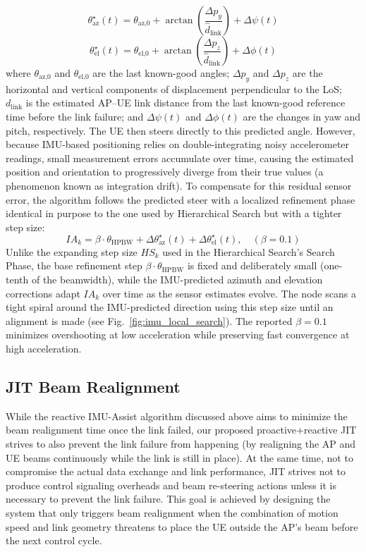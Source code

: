 \documentclass[fleqn,10pt]{wlscirep}
\newcommand{\rev}[1]{#1}
\begin{document}
\begin{equation}
    \theta_{\text{az}}^{\star}(t) = \theta_{\text{az,0}} + \arctan\!\left(\frac{\Delta p_{y}}{\hat{d}_{\text{link}}}\right) + \Delta\psi(t)
\end{equation}
\begin{equation}
    \theta_{\text{el}}^{\star}(t) = \theta_{\text{el,0}} + \arctan\!\left(\frac{\Delta p_{z}}{\hat{d}_{\text{link}}}\right) + \Delta\phi(t)
\end{equation}
where $\theta_{\text{az,0}}$ and $\theta_{\text{el,0}}$ are the last known-good angles; $\Delta p_y$ and $\Delta p_z$ are the horizontal and vertical components of displacement perpendicular to the LoS; $d_{\text{link}}$ is the estimated AP--UE link distance from the last known-good reference time before the link failure; and $\Delta\psi(t)$ and $\Delta\phi(t)$ are the changes in yaw and pitch, respectively. The UE then steers directly to this predicted angle. However, because IMU-based positioning relies on double-integrating noisy accelerometer readings, small measurement errors accumulate over time, causing the estimated position and orientation to progressively diverge from their true values (a phenomenon known as integration drift). To compensate for this residual sensor error, the algorithm follows the predicted steer with a localized refinement phase identical in purpose to the one used by Hierarchical Search but with a tighter step size:
\begin{equation}
    IA_k = \beta \cdot \theta_{\text{HPBW}} + \Delta\theta_{\text{az}}^{\star}(t) + \Delta\theta_{\text{el}}^{\star}(t), \quad (\beta = 0.1)
\end{equation}
Unlike the expanding step size $HS_k$ used in the Hierarchical Search's Search Phase, the base refinement step $\beta \cdot \theta_{\text{HPBW}}$ is fixed and deliberately small (one-tenth of the beamwidth), while the IMU-predicted azimuth and elevation corrections adapt $IA_k$ over time as the sensor estimates evolve. The node scans a tight spiral around the IMU-predicted direction using this step size until an alignment is made (see Fig.~\ref{fig:imu_local_search}). \rev{The reported $\beta = 0.1$ minimizes overshooting at low acceleration while preserving fast convergence at high acceleration.}

\subsection*{JIT Beam Realignment}
While the reactive IMU-Assist algorithm discussed above aims to minimize the beam realignment time once the link failed, our proposed proactive+reactive JIT strives to also prevent the link failure from happening (by realigning the AP and UE beams continuously while the link is still in place). At the same time, not to compromise the actual data exchange and link performance, JIT strives not to produce control signaling overheads and beam re-steering actions unless it is necessary to prevent the link failure. This goal is achieved by designing the system that only triggers beam realignment when the combination of motion speed and link geometry threatens to place the UE outside the AP's beam before the next control cycle.
\end{document}
